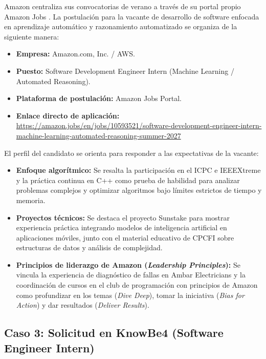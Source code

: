 \documentclass[12pt]{article}
\begin{document}
Amazon centraliza sus convocatorias de verano a través de su portal propio Amazon Jobs \parencite{amazon2026jobs}. La postulación para la vacante de desarrollo de software enfocada en aprendizaje automático y razonamiento automatizado se organiza de la siguiente manera:

\begin{itemize}[leftmargin=0.2in, itemsep=0.2em]
    \item \textbf{Empresa:} Amazon.com, Inc. / AWS.
    \item \textbf{Puesto:} Software Development Engineer Intern (Machine Learning / Automated Reasoning).
    \item \textbf{Plataforma de postulación:} Amazon Jobs Portal.
    \item \textbf{Enlace directo de aplicación:}\\ {\scriptsize\url{https://amazon.jobs/en/jobs/10593521/software-development-engineer-intern-machine-learning-automated-reasoning-summer-2027}}
\end{itemize}

El perfil del candidato se orienta para responder a las expectativas de la vacante:
\begin{itemize}[leftmargin=0.2in, itemsep=0.3em]
    \item \textbf{Enfoque algorítmico:} Se resalta la participación en el ICPC e IEEEXtreme y la práctica continua en C++ como prueba de habilidad para analizar problemas complejos y optimizar algoritmos bajo límites estrictos de tiempo y memoria.
    \item \textbf{Proyectos técnicos:} Se destaca el proyecto Sunstake para mostrar experiencia práctica integrando modelos de inteligencia artificial en aplicaciones móviles, junto con el material educativo de CPCFI sobre estructuras de datos y análisis de complejidad.
    \item \textbf{Principios de liderazgo de Amazon (\textit{Leadership Principles}):} Se vincula la experiencia de diagnóstico de fallas en Ambar Electricians y la coordinación de cursos en el club de programación con principios de Amazon como profundizar en los temas (\textit{Dive Deep}), tomar la iniciativa (\textit{Bias for Action}) y dar resultados (\textit{Deliver Results}).
\end{itemize}

\subsection{Caso 3: Solicitud en KnowBe4 (Software Engineer Intern)}
\label{sec:casoKnowBe4}
\end{document}
